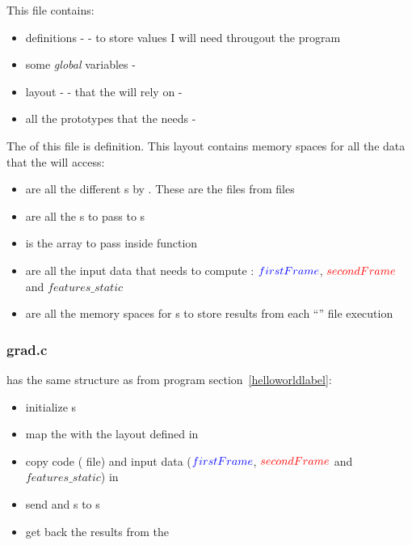 This file contains:
\begin{itemize}
	\item {} definitions -  - to store values I will need througout the program
	\item some \emph{global} variables - 
	\item \ram{} layout -  - that the  will rely on - 
	\item all the  prototypes that the \api{} needs - 
\end{itemize}

The  of this file is  definition. This layout contains \ram{} memory spaces for all the data that the \vc{} will access:
\begin{itemize}
	\item {} are all the different s by \vc{}. These are the  files from  files
	\item {} are all the \uni{}s to pass to \qpu{}s
	\item {} is the  array to pass inside  function
	\item {} are all the input data that \vc{} needs to compute \flow: $\textcolor{blue}{firstFrame}$, $\textcolor{red}{secondFrame}$ and $features\_static$
	\item {} are all the \ram{} memory spaces for \qpu{}s to store results from each \enquote{} file execution
\end{itemize}


\subsubsection{grad.c}\label{gradClbl}

 has the same structure as  from  program section~\ref{helloworldlabel}:
\begin{itemize}
	\item initialize \qpu{}s
	\item map the \ram{} with the layout defined in 
	\item copy code ( file) and input data ($\textcolor{blue}{firstFrame}$, $\textcolor{red}{secondFrame}$ and $features\_static$) in \ram
	\item send   and \uni{}s to \qpu{}s
	\item get back the results from the \ram
\end{itemize}

